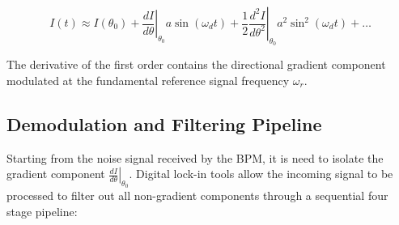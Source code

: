 \begin{equation}
    I(t) \approx I(\theta_0) + \left.\frac{dI}{d\theta}\right|_{\theta_0} a \sin(\omega_d t) + \frac{1}{2}\left.\frac{d^2I}{d\theta^2}\right|_{\theta_0} a^2 \sin^2(\omega_d t) + \dots
\end{equation}

The derivative of the first order contains the directional gradient component modulated at the fundamental reference signal frequency $\omega_r$. 

\subsection{Demodulation and Filtering Pipeline}
Starting from the noise signal received by the BPM, it is need to isolate the gradient component $\left.\frac{dI}{d\theta}\right|_{\theta_0}$.
Digital lock-in tools allow the incoming signal to be processed to filter out all non-gradient components through a sequential four stage pipeline:

